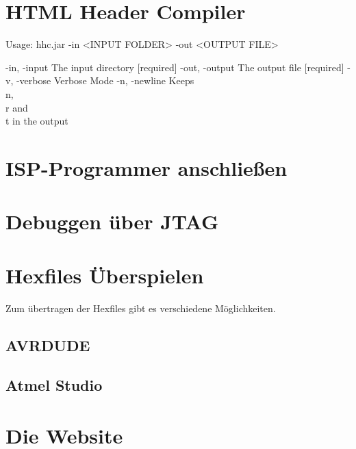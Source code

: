 \section{HTML Header Compiler}

Usage: hhc.jar -in <INPUT FOLDER> -out <OUTPUT FILE>

-in, -input	The input directory [required]
-out, -output	The output file [required]
-v, -verbose	Verbose Mode
-n, -newline	Keeps \\n, \\r and \\t in the output




\section{ISP-Programmer anschließen}

\section{Debuggen über JTAG}

\section{Hexfiles Überspielen}

Zum übertragen der Hexfiles gibt es verschiedene Möglichkeiten.

\subsection{AVRDUDE}



\subsection{Atmel Studio}

\section{Die Website}
